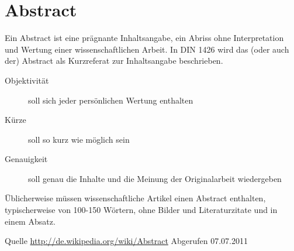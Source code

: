
\pagestyle{empty}


\chapter*{Abstract}
Ein Abstract ist eine prägnante Inhaltsangabe, ein Abriss ohne
Interpretation und Wertung einer wissenschaftlichen Arbeit. In DIN
1426 wird das (oder auch der) Abstract als Kurzreferat zur
Inhaltsangabe beschrieben.

\begin{description}
\item[Objektivität] soll sich jeder persönlichen Wertung enthalten
\item[Kürze] soll so kurz wie möglich sein
\item[Genauigkeit] soll genau die Inhalte und die Meinung der Originalarbeit wiedergeben
\end{description}

Üblicherweise müssen wissenschaftliche Artikel einen Abstract
enthalten, typischerweise von 100-150 Wörtern, ohne Bilder und
Literaturzitate und in einem Absatz.

Quelle \url{http://de.wikipedia.org/wiki/Abstract} Abgerufen 07.07.2011
